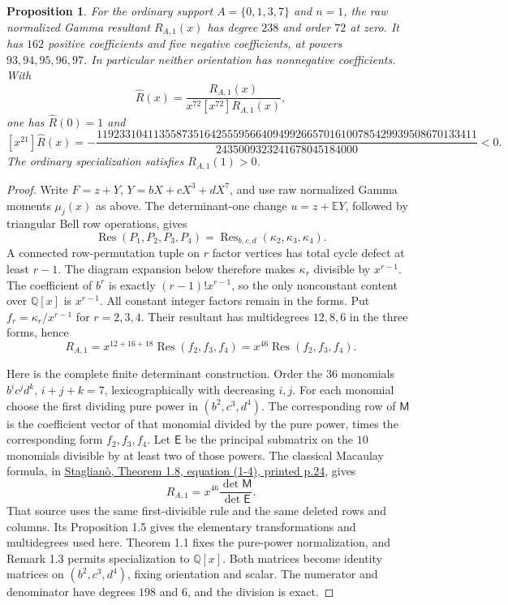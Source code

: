 \documentclass[11pt]{article}
\newtheorem{proposition}{Proposition}
\begin{document}
\begin{proposition}\label{prop:gamma-coefficient-obstruction}
For the ordinary support $A=\{0,1,3,7\}$ and $n=1$, the raw normalized
Gamma resultant $R_{A,1}(x)$ has degree $238$ and order $72$ at zero.
It has $162$ positive coefficients and five negative coefficients,
at powers $93,94,95,96,97$. In particular neither orientation has
nonnegative coefficients. With
\[
 \widehat R(x)=\frac{R_{A,1}(x)}
                    {x^{72}[x^{72}]R_{A,1}(x)},
\]
one has $\widehat R(0)=1$ and
\[
 [x^{21}]\widehat R(x)=
 -\frac{1192331041135587351642555956640949926657016100785429939508670133411}
        {2435009323241678045184000}<0.
\]
The ordinary specialization satisfies $R_{A,1}(1)>0$.
\end{proposition}
\begin{proof}
Write $F=z+Y$, $Y=bX+cX^3+dX^7$, and use raw normalized Gamma
moments $\mu_j(x)$ as above. The determinant-one change
$u=z+\mathbb E Y$, followed by triangular Bell row operations, gives
\[
 \operatorname{Res}(P_1,P_2,P_3,P_4)
        =\operatorname{Res}_{b,c,d}(\kappa_2,\kappa_3,\kappa_4).
\]
A connected row-permutation tuple on $r$ factor vertices has total
cycle defect at least $r-1$. The diagram expansion below therefore
makes $\kappa_r$ divisible by $x^{r-1}$. The coefficient of $b^r$ is exactly
$(r-1)!x^{r-1}$, so the only nonconstant content over $\mathbb Q[x]$
is $x^{r-1}$. All constant integer factors remain in the forms.
Put $f_r=\kappa_r/x^{r-1}$ for $r=2,3,4$.
Their resultant has multidegrees $12,8,6$ in the three forms, hence
\[
 R_{A,1}=x^{12+16+18}\operatorname{Res}(f_2,f_3,f_4)
        =x^{46}\operatorname{Res}(f_2,f_3,f_4).
\]

Here is the complete finite determinant construction. Order the
$36$ monomials $b^ic^jd^k$, $i+j+k=7$, lexicographically with
decreasing $i,j$. For each monomial choose the first dividing pure
power in $(b^2,c^3,d^4)$. The corresponding row of $\mathsf M$ is
the coefficient vector of that monomial divided by the pure power,
times the corresponding form $f_2,f_3,f_4$. Let $\mathsf E$ be the
principal submatrix on the $10$ monomials divisible by at least two
of those powers. The classical Macaulay formula, in
\href{sources/stagliano-classical-resultants-jsag2018.pdf}
{Staglianò, Theorem 1.8, equation (1-4), printed p.24}, gives
\[
 R_{A,1}=x^{46}\frac{\det\mathsf M}{\det\mathsf E}.
\]
That source uses the same first-divisible rule and the same deleted
rows and columns. Its Proposition 1.5 gives the elementary
transformations and multidegrees used here. Theorem 1.1 fixes the pure-power normalization,
and Remark 1.3 permits specialization to $\mathbb Q[x]$.
Both matrices become identity matrices on $(b^2,c^3,d^4)$, fixing
orientation and scalar. The numerator and denominator have degrees
$198$ and $6$, and the division is exact.


\end{proof}
\end{document}
